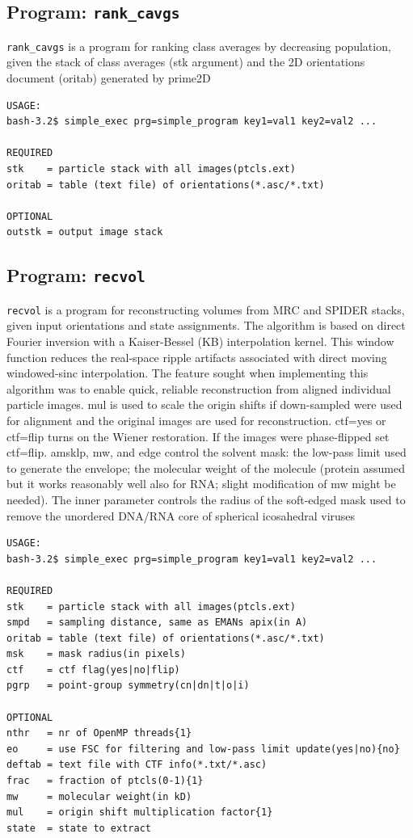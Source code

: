 \documentclass[a4paper,11pt]{article}
\newcommand{\prgname}[1]{\textcolor{NavyBlue}{\texttt{#1}}}
\begin{document}
\subsection{Program: \prgname{rank\_cavgs}}
\label{rank_cavgs}
\prgname{rank\_cavgs} is a program for ranking class averages by decreasing population, given the stack of class averages (stk argument) and the 2D orientations document (oritab) generated by prime2D

\begin{verbatim}
USAGE:
bash-3.2$ simple_exec prg=simple_program key1=val1 key2=val2 ...

REQUIRED
stk    = particle stack with all images(ptcls.ext)
oritab = table (text file) of orientations(*.asc/*.txt)

OPTIONAL
outstk = output image stack
\end{verbatim}

\subsection{Program: \prgname{recvol}}
\label{recvol}
\prgname{recvol} is a program for reconstructing volumes from MRC and SPIDER stacks, given input orientations and state assignments. The algorithm is based on direct Fourier inversion with a Kaiser-Bessel (KB) interpolation kernel. This window function reduces the real-space ripple artifacts associated with direct moving windowed-sinc interpolation. The feature sought when implementing this algorithm was to enable quick, reliable reconstruction from aligned individual particle images. mul is used to scale the origin shifts if down-sampled were used for alignment and the original images are used for reconstruction. ctf=yes or ctf=flip turns on the Wiener restoration. If the images were phase-flipped set ctf=flip. amsklp, mw, and edge control the solvent mask: the low-pass limit used to generate the envelope; the molecular weight of the molecule (protein assumed but it works reasonably well also for RNA; slight modification of mw might be needed). The inner parameter controls the radius of the soft-edged mask used to remove the unordered DNA/RNA core of spherical icosahedral viruses

\begin{verbatim}
USAGE:
bash-3.2$ simple_exec prg=simple_program key1=val1 key2=val2 ...

REQUIRED
stk    = particle stack with all images(ptcls.ext)
smpd   = sampling distance, same as EMANs apix(in A)
oritab = table (text file) of orientations(*.asc/*.txt)
msk    = mask radius(in pixels)
ctf    = ctf flag(yes|no|flip)
pgrp   = point-group symmetry(cn|dn|t|o|i)

OPTIONAL
nthr   = nr of OpenMP threads{1}
eo     = use FSC for filtering and low-pass limit update(yes|no){no}
deftab = text file with CTF info(*.txt/*.asc)
frac   = fraction of ptcls(0-1){1}
mw     = molecular weight(in kD)
mul    = origin shift multiplication factor{1}
state  = state to extract
\end{verbatim}
\end{document}
